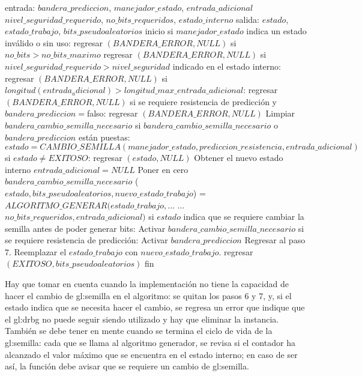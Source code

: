 \begin{pseudocodigo}[caption={DRBG, generación.}, label={drbg:3}]
    entrada:  $bandera\_prediccion$, $manejador\_estado$, $entrada\_adicional$
              $nivel\_seguridad\_requerido$, $no\_bits\_requeridos$, $estado\_interno$
    salida:   $estado$, $estado\_trabajo$, $bits\_pseudoaleatorios$
    inicio
      si $manejador\_estado$ indica un estado inválido o sin uso:
        regresar $(BANDERA\_ERROR, NULL)$
      si $no\_bits > no\_bits\_maximo$
        regresar $(BANDERA\_ERROR, NULL)$
      si $nivel\_seguridad\_requerido > nivel\_seguridad$ indicado en el estado interno:
        regresar $(BANDERA\_ERROR, NULL)$
      si $longitud(entrada_adicional) > longitud\_max\_entrada\_adicional$:
        regresar $(BANDERA\_ERROR, NULL)$
      si se requiere resistencia de predicción y $bandera\_prediccion=$falso:
        regresar $(BANDERA\_ERROR, NULL)$
      Limpiar $bandera\_cambio\_semilla\_necesario$
      si $bandera\_cambio\_semilla\_necesario$ o $bandera\_prediccion$ están puestas:
        $estado = CAMBIO\_SEMILLA(manejador\_estado, prediccion\_resistencia, entrada\_adicional)$
        si $estado \neq EXITOSO$:
          regresar $(estado, NULL)$
        Obtener el nuevo estado interno
        $entrada\_adicional = NULL$
        Poner en cero $bandera\_cambio\_semilla\_necesario$
      ($estado, bits\_pseudoaleatorios, nuevo\_estado\_trabajo$) = $ALGORITMO\_GENERAR(estado\_trabajo,$...
        ...$no\_bits\_requeridos, entrada\_adicional)$
      si $estado$ indica que se requiere cambiar la semilla antes de poder generar bits:
        Activar $bandera\_cambio\_semilla\_necesario$
        si se requiere resistencia de predicción:
          Activar $bandera\_prediccion$
        Regresar al paso 7.
      Reemplazar el $estado\_trabajo$ con $nuevo\_estado\_trabajo$.
      regresar $(EXITOSO, bits\_pseudoaleatorios)$
    fin
\end{pseudocodigo}

Hay que tomar en cuenta cuando la implementación no tiene la capacidad de
hacer el cambio de \gls{gl:semilla} en el algoritmo: se quitan los pasos 6 y
7, y, si el estado indica que se necesita hacer el cambio, se regresa un
error que indique que el \gls{gl:drbg} no puede seguir siendo utilizado y
hay que eliminar la instancia. También se debe tener en mente cuando se
termina el ciclo de vida de la \gls{gl:semilla}: cada que se llama al
algoritmo generador, se revisa si el contador ha alcanzado el valor máximo
que se encuentra en el estado interno; en caso de ser así, la función debe
avisar que se requiere un cambio de \gls{gl:semilla}.

